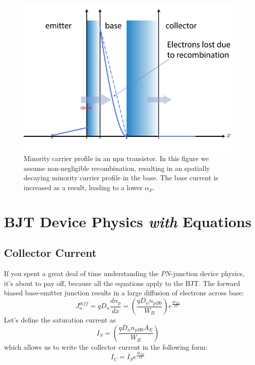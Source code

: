 \begin{figure}[tb]
\centering
\includegraphics[width=.75\columnwidth]{slide12_alpha_f}
\caption{Minority carrier profile in an npn transistor.  In this figure we assume non-negligible recombination, resulting in an spatially decaying minority carrier profile in the base.  The base current is increased as a result, leading to a lower $\alpha_F$.}
\label{fig:slide12_alpha_f}
\end{figure}
\section{BJT Device Physics \emph{with} Equations}
\subsection{Collector Current}
If you spent a great deal of time understanding the $PN$-junction device physics, it's about to pay off, because all the equations apply to the BJT.  The forward biased base-emitter junction results in a large diffusion of electrons across base:
    \begin{equation}
        J_n^{diff} = q{D_n}\frac{{d{n_p}}}{{dx}} = \left( {\frac{{q{D_n}{n_{pB0}}}}{{{W_B}}}} \right){e^{\frac{{q{V_{BE}}}}{{kT}}}}
    \end{equation}
Let's define the saturation current as
    \begin{equation}
        {I_S} = \left( {\frac{{q{D_n}{n_{pB0}}{A_E}}}{{{W_B}}}} \right)
    \end{equation}
which allows us to write the collector current in the following form:
    \begin{equation}
        {I_C} = {I_S}{e^{\frac{{q{V_{BE}}}}{{kT}}}}
    \end{equation}
